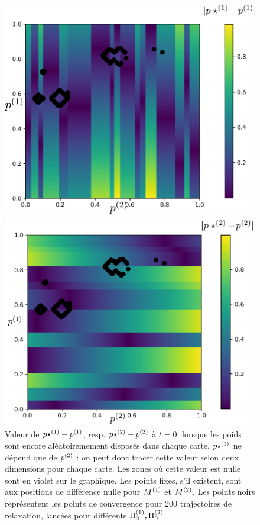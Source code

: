\begin{figure}
\begin{minipage}{0.5\textwidth}
\centering
\includegraphics[width=\textwidth]{champ_X_006_t1_notraj.pdf}
\end{minipage}
\begin{minipage}{0.5\textwidth}
\centering
\includegraphics[width=\textwidth]{champ_Y_006_t1_notraj.pdf}
\end{minipage}
\caption{Valeur de ${p\star}^{({1})} - p^{({1})}$, resp. ${p\star}^{({2})} - p^{({2})}$ à $t=0$ ,lorsque les poids sont encore aléatoiremement disposés dans chaque carte.
 ${p\star}^{({1})}$ ne dépend que de $p^{({2})}$ : on peut donc tracer cette valeur selon deux dimensions pour chaque carte. Les zones où cette valeur est nulle sont en violet sur le graphique. Les points fixes, s'il existent, sont aux positions de différence nulle pour $M^{({1})}$ et $M^{({2})}$. Les points noirs représentent les points de convergence pour 200 trajectoires de relaxation, lancées pour différents $\Pi_0^{({1})}, \Pi_0^{({2})}$.}
 
\label{fig:diff_relax_t1_notraj}
\end{figure}

